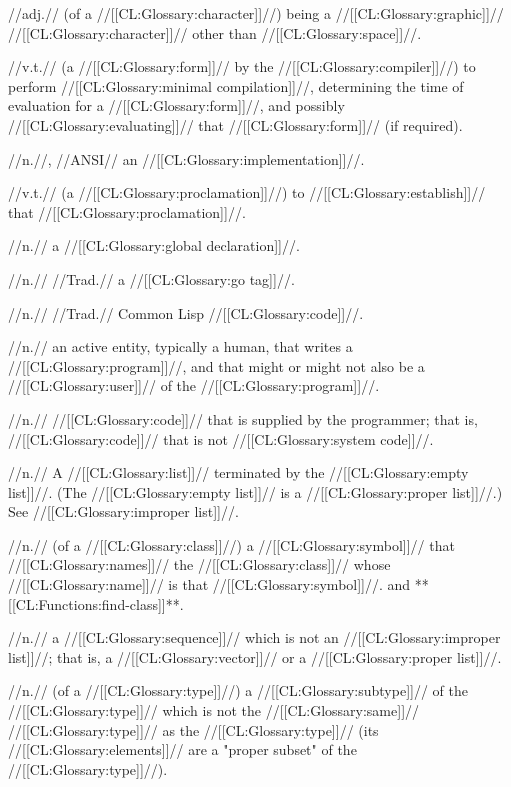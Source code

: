  //adj.// (of a //[[CL:Glossary:character]]//) being a //[[CL:Glossary:graphic]]// //[[CL:Glossary:character]]// other than //[[CL:Glossary:space]]//.

 //v.t.// (a //[[CL:Glossary:form]]// by the //[[CL:Glossary:compiler]]//) to perform //[[CL:Glossary:minimal compilation]]//, determining the time of evaluation for a //[[CL:Glossary:form]]//, and possibly //[[CL:Glossary:evaluating]]// that //[[CL:Glossary:form]]// (if required).

 //n.//, //ANSI// an //[[CL:Glossary:implementation]]//.

 //v.t.// (a //[[CL:Glossary:proclamation]]//) to //[[CL:Glossary:establish]]// that //[[CL:Glossary:proclamation]]//.

 //n.// a //[[CL:Glossary:global declaration]]//.

 //n.// //Trad.// a //[[CL:Glossary:go tag]]//.

 //n.// //Trad.// Common Lisp //[[CL:Glossary:code]]//.

 //n.// an active entity, typically a human, that writes a //[[CL:Glossary:program]]//, and that might or might not also be a //[[CL:Glossary:user]]// of the //[[CL:Glossary:program]]//.

 //n.// //[[CL:Glossary:code]]// that is supplied by the programmer; that is, //[[CL:Glossary:code]]// that is not //[[CL:Glossary:system code]]//.

 //n.// A //[[CL:Glossary:list]]// terminated by the //[[CL:Glossary:empty list]]//. (The //[[CL:Glossary:empty list]]// is a //[[CL:Glossary:proper list]]//.) See //[[CL:Glossary:improper list]]//.

 //n.// (of a //[[CL:Glossary:class]]//) a //[[CL:Glossary:symbol]]// that //[[CL:Glossary:names]]// the //[[CL:Glossary:class]]// whose //[[CL:Glossary:name]]// is that //[[CL:Glossary:symbol]]//.  and **[[CL:Functions:find-class]]**.
 
 //n.// a //[[CL:Glossary:sequence]]// which is not an //[[CL:Glossary:improper list]]//; that is, a //[[CL:Glossary:vector]]// or a //[[CL:Glossary:proper list]]//.
 
 //n.// (of a //[[CL:Glossary:type]]//) a //[[CL:Glossary:subtype]]// of the //[[CL:Glossary:type]]// which is not the //[[CL:Glossary:same]]// //[[CL:Glossary:type]]// as the //[[CL:Glossary:type]]// (\ie its //[[CL:Glossary:elements]]// are a "proper subset" of the //[[CL:Glossary:type]]//).
 
